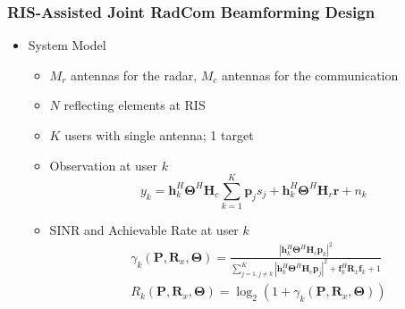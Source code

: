 \documentclass[9pt]{beamer}
\begin{document}

\begin{frame}
  \frametitle{RIS-Assisted Joint RadCom Beamforming Design}
  \begin{itemize}
    \item System Model
      \begin{itemize}
        \item $M_r$ antennas for the radar, $M_c$ antennas for the communication
        \item $N$ reflecting elements at RIS
        \item $K$ users with single antenna; 1 target
        \item Observation at user $k$
          \begin{equation*}
            y_k = \mathbf{h}_k^H \mathbf{\Theta}^H \mathbf{H}_c \sum_{k=1}^K \mathbf{p}_j s_j + \mathbf{h}_k^H \mathbf{\Theta}^H \mathbf{H}_r \mathbf{r} + n_k
          \end{equation*}
        \item SINR and Achievable Rate at user $k$
          \begin{align*}
            &\gamma_k(\mathbf{P},\mathbf{R}_x,\mathbf{\Theta}) = \frac{|\mathbf{h}_k^H \mathbf{\Theta}^H \mathbf{H}_c \mathbf{p}_k|^2} {\sum_{j=1,j\neq k}^{K} |\mathbf{h}_k^H \mathbf{\Theta}^H \mathbf{H}_c \mathbf{p}_j|^2 + \mathbf{f}_k^H \mathbf{R}_x \mathbf{f}_k + 1}\\
            &R_k(\mathbf{P},\mathbf{R}_x,\mathbf{\Theta}) = \log_2 ( 1 + \gamma_k (\mathbf{P},\mathbf{R}_x,\mathbf{\Theta}))
          \end{align*}
      \end{itemize}
  \end{itemize}



\end{frame}
\end{document}
